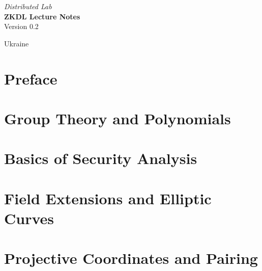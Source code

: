 \documentclass{zkdl-template-105x135}
\def\maketitle{
    \begin{center}
        \vspace{5mm}
        {\Large\sffamily \emph{Distributed Lab}} \\ \vspace{30mm}
        {\huge\sffamily\bfseries ZKDL Lecture Notes} \\ \vspace{5mm}
        {Version 0.2} \\ \vspace{10mm}
    \end{center}
    
    \vfill

    \begin{center}
        {Ukraine} \\ \vspace{2mm}
        {\sffamily \the\year}
    \end{center}

    \thispagestyle{empty}
    \pagebreak
}
\begin{document}
    \maketitle

    \pagecolor{white}
    
    \vspace*{\fill}

    \begin{abstract}
        \fontsize{7}{8}\selectfont
        
    \end{abstract}
    
    \vspace*{\fill}
    
    \thispagestyle{empty}
    \newpage

    \pagestyle{fancy}
    \pagecolor{white}

    \tableofcontents

    \pagebreak


    \section*{Preface}

    

    \section{Group Theory and Polynomials} \label{section:math-crypto-1}

    

    \section{Basics of Security Analysis}\label{section:math-crypto-2}

    

    \section{Field Extensions and Elliptic Curves}

    \label{section:field_extensions}

    \section{Projective Coordinates and Pairing}
\end{document}
